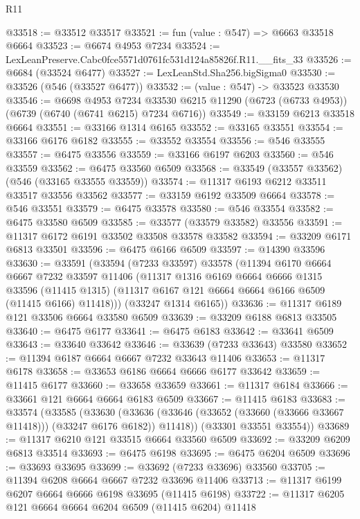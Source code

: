 \begin{lexlean}{R11}
\begin{coremodule}
@33518 := @33512 @33517
@33521 := fun (value : @547) => @6663 @33518 @6664
@33523 := @6674 @4953 @7234
@33524 := LexLeanPreserve.Cabc0fce5571d0761fc531d124a85826f.R11.__fits_33
@33526 := @6684 (@33524 @6477)
@33527 := LexLeanStd.Sha256.bigSigma0
@33530 := @33526 (@546 (@33527 @6477))
@33532 := (value : @547) -> @33523 @33530
@33546 := @6698
    @4953
    @7234
    @33530
    @6215
    @11290
    (@6723 (@6733 @4953))
    (@6739 (@6740 (@6741 @6215) @7234 @6716))
@33549 := @33159 @6213 @33518 @6664
@33551 := @33166 @1314 @6165
@33552 := @33165 @33551
@33554 := @33166 @6176 @6182
@33555 := @33552 @33554
@33556 := @546 @33555
@33557 := @6475 @33556
@33559 := @33166 @6197 @6203
@33560 := @546 @33559
@33562 := @6475 @33560 @6509
@33568 := @33549 (@33557 @33562) (@546 (@33165 @33555 @33559))
@33574 := @11317 @6193 @6212 @33511 @33517 @33556 @33562
@33577 := @33159 @6192 @33509 @6664
@33578 := @546 @33551
@33579 := @6475 @33578
@33580 := @546 @33554
@33582 := @6475 @33580 @6509
@33585 := @33577 (@33579 @33582) @33556
@33591 := @11317 @6172 @6191 @33502 @33508 @33578 @33582
@33594 := @33209 @6171 @6813 @33501
@33596 := @6475 @6166 @6509
@33597 := @14390 @33596
@33630 := @33591
    (@33594
      (@7233 @33597)
      @33578
      (@11394
        @6170
        @6664
        @6667
        @7232
        @33597
        @11406
        (@11317
          @1316
          @6169
          @6664
          @6666
          @1315
          @33596
          (@11415 @1315)
          (@11317 @6167 @121 @6664 @6664 @6166 @6509 (@11415 @6166) @11418)))
      (@33247 @1314 @6165))
@33636 := @11317 @6189 @121 @33506 @6664 @33580 @6509
@33639 := @33209 @6188 @6813 @33505
@33640 := @6475 @6177
@33641 := @6475 @6183
@33642 := @33641 @6509
@33643 := @33640 @33642
@33646 := @33639 (@7233 @33643) @33580
@33652 := @11394 @6187 @6664 @6667 @7232 @33643 @11406
@33653 := @11317 @6178
@33658 := @33653 @6186 @6664 @6666 @6177 @33642
@33659 := @11415 @6177
@33660 := @33658 @33659
@33661 := @11317 @6184
@33666 := @33661 @121 @6664 @6664 @6183 @6509
@33667 := @11415 @6183
@33683 := @33574
    (@33585
      (@33630
        (@33636 (@33646 (@33652 (@33660 (@33666 @33667 @11418))) (@33247 @6176 @6182)) @11418))
      (@33301 @33551 @33554))
@33689 := @11317 @6210 @121 @33515 @6664 @33560 @6509
@33692 := @33209 @6209 @6813 @33514
@33693 := @6475 @6198
@33695 := @6475 @6204 @6509
@33696 := @33693 @33695
@33699 := @33692 (@7233 @33696) @33560
@33705 := @11394 @6208 @6664 @6667 @7232 @33696 @11406
@33713 := @11317 @6199 @6207 @6664 @6666 @6198 @33695 (@11415 @6198)
@33722 := @11317 @6205 @121 @6664 @6664 @6204 @6509 (@11415 @6204) @11418

\end{coremodule}
\end{lexlean}
